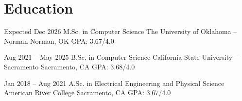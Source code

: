 \section{Education}

\cventry
    {Expected Dec 2026}
    {M.Sc. in Computer Science}
    {The University of Oklahoma -- Norman}
    {Norman, OK}
    {GPA: 3.67/4.0}
    {}

\cventry
    {Aug 2021 -- May 2025}
    {B.Sc. in Computer Science}
    {California State University -- Sacramento}
    {Sacramento, CA}
    {GPA: 3.68/4.0}
    {}

\cventry
    {Jan 2018 -- Aug 2021}
    {A.Sc. in Electrical Engineering and Physical Science}
    {American River College}
    {Sacramento, CA}
    {GPA: 3.67/4.0}
    {}
